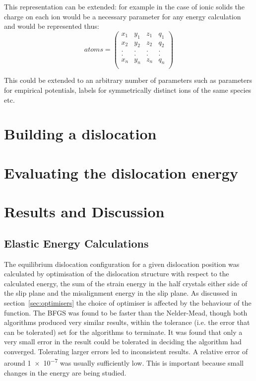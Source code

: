 This representation can be extended: for example in the case of ionic solids the charge on each ion would be a necessary parameter for any energy calculation and would be represented thus:
$$
atoms = \begin{pmatrix}
x_1 & y_1 & z_1 & q_1 \\
x_2 & y_2 & z_2 & q_2 \\
.   &.    &.    &.    \\
.   &.    &.    &.    \\
x_n & y_n & z_n & q_n \\
\end{pmatrix}
$$

This could be extended to an arbitrary number of parameters such as parameters for empirical potentials, labels for symmetrically distinct ions of the same species etc.





\section{Building a dislocation}
\FloatBarrier
\label{sec:build}










\section{Evaluating the dislocation energy}
\label{sec:dislocation_energy}






\section{Results and Discussion}

\subsection{Elastic Energy Calculations}
\label{sec:elastic_results}

The equilibrium dislocation configuration for a given dislocation position was calculated by optimisation of the dislocation structure with respect to the calculated energy, the sum of the strain energy in the half crystals either side of the slip plane and the misalignment energy in the slip plane. As discussed in section~\ref{sec:optimisers} the choice of optimiser is affected by the behaviour of the function. The BFGS was found to be faster than the Nelder-Mead, though both algorithms produced very similar results, within the tolerance (i.e. the error that can be tolerated) set for the algorithms to terminate. It was found that only a very small error in the result could be tolerated in deciding the algorithm had converged. Tolerating larger errors led to inconsistent results. A relative error of around \num{1e-7} was usually sufficiently low. This is important because small changes in the energy are being studied. 

